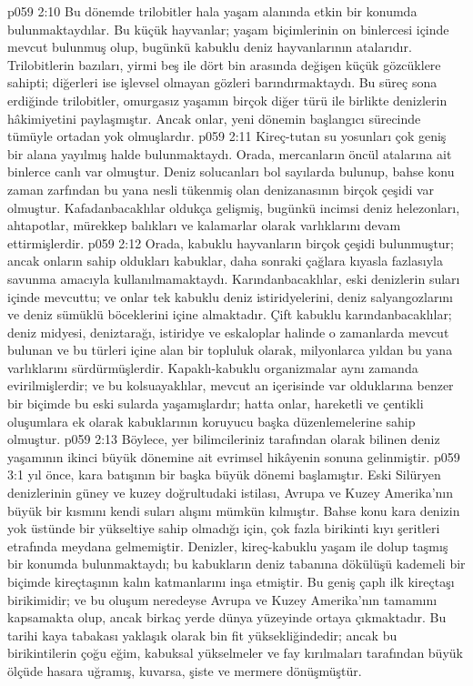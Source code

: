 \vs p059 2:10 Bu dönemde trilobitler hala yaşam alanında etkin bir konumda bulunmaktaydılar. Bu küçük hayvanlar; yaşam biçimlerinin on binlercesi içinde mevcut bulunmuş olup, bugünkü kabuklu deniz hayvanlarının atalarıdır. Trilobitlerin bazıları, yirmi beş ile dört bin arasında değişen küçük gözcüklere sahipti; diğerleri ise işlevsel olmayan gözleri barındırmaktaydı. Bu süreç sona erdiğinde trilobitler, omurgasız yaşamın birçok diğer türü ile birlikte denizlerin hâkimiyetini paylaşmıştır. Ancak onlar, yeni dönemin başlangıcı sürecinde tümüyle ortadan yok olmuşlardır.
\vs p059 2:11 Kireç\hyp{}tutan su yosunları çok geniş bir alana yayılmış halde bulunmaktaydı. Orada, mercanların öncül atalarına ait binlerce canlı var olmuştur. Deniz solucanları bol sayılarda bulunup, bahse konu zaman zarfından bu yana nesli tükenmiş olan denizanasının birçok çeşidi var olmuştur. Kafadanbacaklılar oldukça gelişmiş, bugünkü incimsi deniz helezonları, ahtapotlar, mürekkep balıkları ve kalamarlar olarak varlıklarını devam ettirmişlerdir.
\vs p059 2:12 Orada, kabuklu hayvanların birçok çeşidi bulunmuştur; ancak onların sahip oldukları kabuklar, daha sonraki çağlara kıyasla fazlasıyla savunma amacıyla kullanılmamaktaydı. Karındanbacaklılar, eski denizlerin suları içinde mevcuttu; ve onlar tek kabuklu deniz istiridyelerini, deniz salyangozlarını ve deniz sümüklü böceklerini içine almaktadır. Çift kabuklu karındanbacaklılar; deniz midyesi, deniztarağı, istiridye ve eskaloplar halinde o zamanlarda mevcut bulunan ve bu türleri içine alan bir topluluk olarak, milyonlarca yıldan bu yana varlıklarını sürdürmüşlerdir. Kapaklı\hyp{}kabuklu organizmalar aynı zamanda evirilmişlerdir; ve bu kolsuayaklılar, mevcut an içerisinde var olduklarına benzer bir biçimde bu eski sularda yaşamışlardır; hatta onlar, hareketli ve çentikli oluşumlara ek olarak kabuklarının koruyucu başka düzenlemelerine sahip olmuştur.
\vs p059 2:13 Böylece, yer bilimcileriniz tarafından  olarak bilinen deniz yaşamının ikinci büyük dönemine ait evrimsel hikâyenin sonuna gelinmiştir.
\vs p059 3:1  yıl önce, kara batışının bir başka büyük dönemi başlamıştır. Eski Silüryen denizlerinin güney ve kuzey doğrultudaki istilası, Avrupa ve Kuzey Amerika’nın büyük bir kısmını kendi suları alışını mümkün kılmıştır. Bahse konu kara denizin yok üstünde bir yükseltiye sahip olmadığı için, çok fazla birikinti kıyı şeritleri etrafında meydana gelmemiştir. Denizler, kireç\hyp{}kabuklu yaşam ile dolup taşmış bir konumda bulunmaktaydı; bu kabukların deniz tabanına dökülüşü kademeli bir biçimde kireçtaşının kalın katmanlarını inşa etmiştir. Bu geniş çaplı ilk kireçtaşı birikimidir; ve bu oluşum neredeyse Avrupa ve Kuzey Amerika’nın tamamını kapsamakta olup, ancak birkaç yerde dünya yüzeyinde ortaya çıkmaktadır. Bu tarihi kaya tabakası yaklaşık olarak bin fit yüksekliğindedir; ancak bu birikintilerin çoğu eğim, kabuksal yükselmeler ve fay kırılmaları tarafından büyük ölçüde hasara uğramış, kuvarsa, şiste ve mermere dönüşmüştür.
